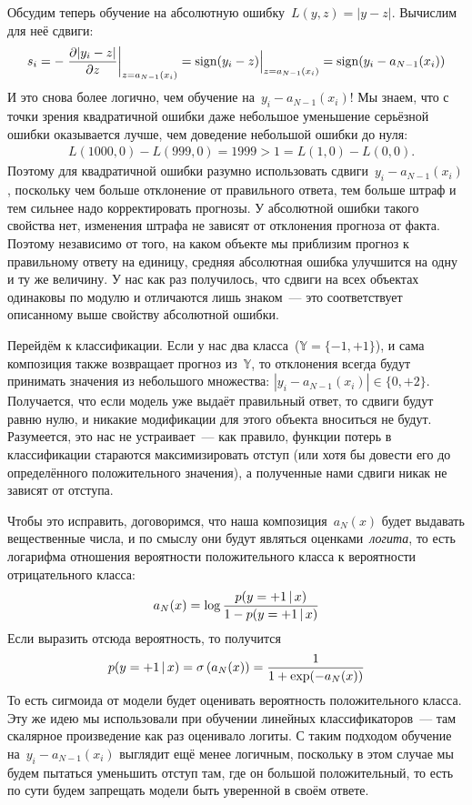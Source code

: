 \documentclass[12pt,fleqn]{article}
\begin{document}
Обсудим теперь обучение на абсолютную ошибку~$L(y, z) = |y - z|$.
Вычислим для неё сдвиги:
\[
    s_i = - \left. \frac{\partial |y_i - z|}{\partial 
        z} \right|_{z=a_{N-1}(x_i)} = 
    \Bigl. \mathop{\rm sign}\limits(y_i - z) \Bigr|_{z=a_{N-1}(x_i)} =
    \mathop{\rm sign}\limits(y_i - a_{N-1}(x_i))
\]
И это снова более логично, чем обучение на~$y_i - a_{N - 1}(x_i)$!
Мы знаем, что с точки зрения квадратичной ошибки даже небольшое уменьшение серьёзной ошибки
оказывается лучше, чем доведение небольшой ошибки до нуля:
\begin{align*}
    &L(1000, 0) - L(999, 0) = 1999 > 1 = L(1, 0) - L(0, 0).
\end{align*}
Поэтому для квадратичной ошибки разумно использовать сдвиги~$y_i - a_{N - 1}(x_i)$,
поскольку чем больше отклонение от правильного ответа, тем больше штраф и тем сильнее надо корректировать прогнозы.
У абсолютной ошибки такого свойства нет, изменения штрафа не зависят от отклонения прогноза от факта.
Поэтому независимо от того, на каком объекте мы приблизим прогноз к правильному ответу на единицу,
средняя абсолютная ошибка улучшится на одну и ту же величину.
У нас как раз получилось, что сдвиги на всех объектах одинаковы по модулю и отличаются лишь знаком~---
это соответствует описанному выше свойству абсолютной ошибки.

Перейдём к классификации.
Если у нас два класса~($\mathbb{Y} = \{-1, +1\}$),
и сама композиция также возвращает прогноз из~$\mathbb{Y}$,
то отклонения всегда будут принимать значения из небольшого множества:
$|y_i - a_{N - 1}(x_i)| \in \{0, +2\}$.
Получается, что если модель уже выдаёт правильный ответ, то сдвиги будут равню нулю,
и никакие модификации для этого объекта вноситься не будут.
Разумеется, это нас не устраивает~--- как правило, функции потерь в классификации
стараются максимизировать отступ (или хотя бы довести его до определённого положительного значения),
а полученные нами сдвиги никак не зависят от отступа.

Чтобы это исправить, договоримся, что наша композиция~$a_N(x)$ будет выдавать вещественные числа,
и по смыслу они будут являться оценками~\emph{логита},
то есть логарифма отношения вероятности положительного класса к вероятности отрицательного класса:
\[
    a_N(x)
    =
    \log
    \frac{
        p(y = +1 \mspace{3mu}{|}\mspace{3mu} x)
    }{
        1 - p(y = +1 \mspace{3mu}{|}\mspace{3mu} x)
    }
\]
Если выразить отсюда вероятность, то получится
\[
    p(y = +1 \mspace{3mu}{|}\mspace{3mu} x)
    =
    \sigma\left(
        a_N(x)
    \right)
    =
    \frac{
        1
    }{
        1 + \exp(-a_{N}(x))
    }
\]
То есть сигмоида от модели будет оценивать вероятность положительного класса.
Эту же идею мы использовали при обучении линейных классификаторов~--- там скалярное произведение как раз
оценивало логиты.
С таким подходом обучение на~$y_i - a_{N - 1}(x_i)$ выглядит ещё менее логичным, поскольку в этом случае
мы будем пытаться уменьшить отступ там, где он большой положительный,
то есть по сути будем запрещать модели быть уверенной в своём ответе.
\end{document}
